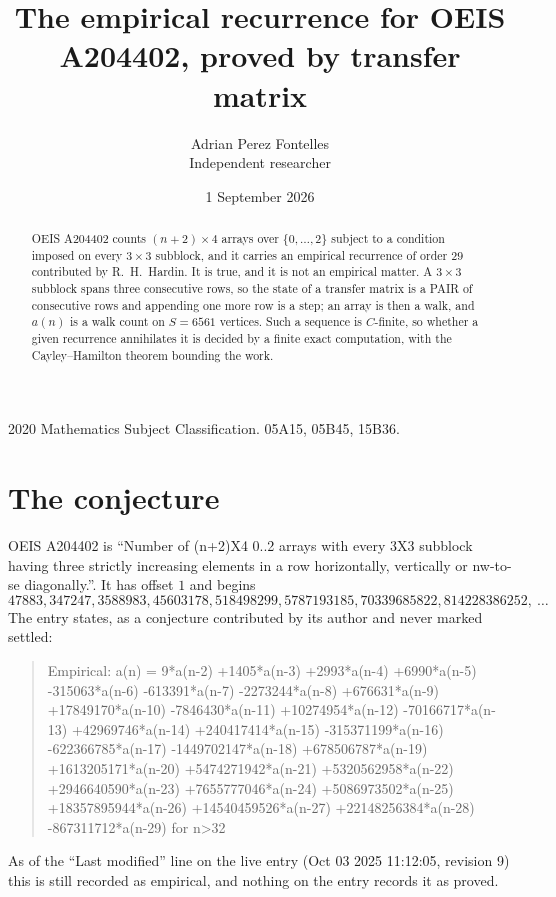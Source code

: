 \documentclass[11pt,a4paper]{article}
\title{The empirical recurrence for OEIS A204402, proved by transfer matrix}
\author{Adrian Perez Fontelles\\ \small Independent researcher}
\date{1 September 2026}
\theoremstyle{plain}
\theoremstyle{definition}
\begin{document}
\maketitle

\begin{abstract}
OEIS A204402 counts $(n+2)\times4$ arrays over $\{0,\dots,2\}$ subject to a condition imposed on
every $3\times3$ subblock, and it carries an empirical recurrence of order $29$
contributed by R.~H.~Hardin. It is true, and it is not an empirical matter. A $3\times3$
subblock spans three consecutive rows, so the state of a transfer matrix is a PAIR of
consecutive rows and appending one more row is a step; an array is then a walk, and
$a(n)$ is a walk count on $S=6561$ vertices. Such a sequence is $C$-finite, so whether a given
recurrence annihilates it is decided by a finite exact computation, with the Cayley--Hamilton
theorem bounding the work.
\end{abstract}

\noindent\small 2020 Mathematics Subject Classification. 05A15, 05B45, 15B36.\normalsize

\section{The conjecture}

OEIS A204402 is ``Number of (n+2)X4 0..2 arrays with every 3X3 subblock having three strictly increasing elements in a row horizontally, vertically or nw-to-se diagonally.''. It has offset $1$ and begins
\[
47883, 347247, 3588983, 45603178, 518498299, 5787193185, 70339685822, 814228386252,\ \dots
\]
The entry states, as a conjecture contributed by its author and never marked settled:
\begin{quote}
Empirical: a(n) = 9*a(n-2) +1405*a(n-3) +2993*a(n-4) +6990*a(n-5) -315063*a(n-6) -613391*a(n-7) -2273244*a(n-8) +676631*a(n-9) +17849170*a(n-10) -7846430*a(n-11) +10274954*a(n-12) -70166717*a(n-13) +42969746*a(n-14) +240417414*a(n-15) -315371199*a(n-16) -622366785*a(n-17) -1449702147*a(n-18) +678506787*a(n-19) +1613205171*a(n-20) +5474271942*a(n-21) +5320562958*a(n-22) +2946640590*a(n-23) +7655777046*a(n-24) +5086973502*a(n-25) +18357895944*a(n-26) +14540459526*a(n-27) +22148256384*a(n-28) -867311712*a(n-29) for n>32
\end{quote}
As of the ``Last modified'' line on the live entry (Oct 03 2025 11:12:05, revision 9) this is still
recorded as empirical, and nothing on the entry records it as proved.
\end{document}
